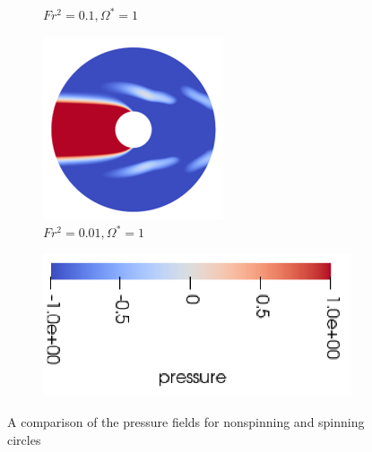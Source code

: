 \begin{figure}
\begin{subfigure}[b]{0.25\textwidth}
        \caption{$Fr^2 = 0.1, \Omega^{\ast} = 1$}
        \label{fig:ps1fs0p1}
    \end{subfigure}
    \hfill
    \begin{subfigure}[b]{0.25\textwidth}
        \centering
        \includegraphics[width=\textwidth]{images/circle/ps1fs0p01.png}
        \caption{$Fr^2 = 0.01, \Omega^{\ast} = 1$}
        \label{fig:ps1fs0p01}
    \end{subfigure}
    
    \begin{subfigure}[b]{0.25\textwidth}
        \centering
        \includegraphics[width=\textwidth]{images/circle/p_scale.png}
        \caption*{}
    \end{subfigure}
    
    \caption{A comparison of the pressure fields for nonspinning and spinning circles}
    \label{fig:circle_pressure}
\end{figure}
